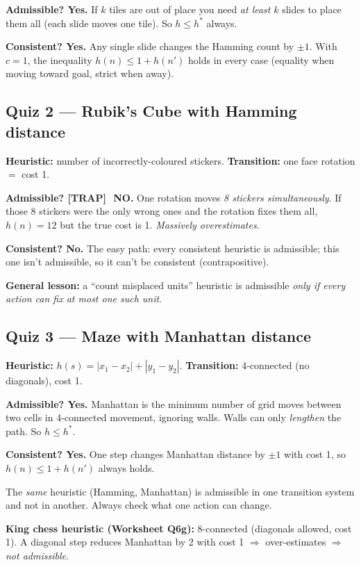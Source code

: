 \documentclass[11pt, a4paper]{article}
\newcommand{\trapflag}{\textcolor{trapBd}{\textbf{[TRAP]}}\,}
\begin{document}
\textbf{Admissible? Yes.} If $k$ tiles are out of place you need \emph{at least} $k$ slides to place them all (each slide moves one tile). So $h \le h^*$ always.

\textbf{Consistent? Yes.} Any single slide changes the Hamming count by $\pm 1$. With $c = 1$, the inequality $h(n) \le 1 + h(n')$ holds in every case (equality when moving toward goal, strict when away).

\subsection{Quiz 2 --- Rubik's Cube with Hamming distance}

\textbf{Heuristic:} number of incorrectly-coloured stickers. \textbf{Transition:} one face rotation $=$ cost 1.

\textbf{Admissible? \trapflag\ NO.} One rotation moves \emph{8 stickers simultaneously}. If those 8 stickers were the only wrong ones and the rotation fixes them all, $h(n) = 12$ but the true cost is 1. \emph{Massively overestimates}.

\textbf{Consistent? No.} The easy path: every consistent heuristic is admissible; this one isn't admissible, so it can't be consistent (contrapositive).

\textbf{General lesson:} a ``count misplaced units'' heuristic is admissible \emph{only if every action can fix at most one such unit}.

\subsection{Quiz 3 --- Maze with Manhattan distance}

\textbf{Heuristic:} $h(s) = |x_1 - x_2| + |y_1 - y_2|$. \textbf{Transition:} 4-connected (no diagonals), cost 1.

\textbf{Admissible? Yes.} Manhattan is the minimum number of grid moves between two cells in 4-connected movement, ignoring walls. Walls can only \emph{lengthen} the path. So $h \le h^*$.

\textbf{Consistent? Yes.} One step changes Manhattan distance by $\pm 1$ with cost 1, so $h(n) \le 1 + h(n')$ always holds.

\begin{trapbox}
The \emph{same} heuristic (Hamming, Manhattan) is admissible in one transition system and not in another. Always check what one action can change.

\textbf{King chess heuristic (Worksheet Q6g):} 8-connected (diagonals allowed, cost 1). A diagonal step reduces Manhattan by 2 with cost 1 $\Rightarrow$ over-estimates $\Rightarrow$ \emph{not admissible}.
\end{trapbox}
\end{document}
